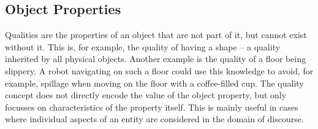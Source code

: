 

\subsection{Object Properties}
\label{sec:qualification}

Qualities are the properties of an object that are not part of it, but cannot exist without it.
This is, for example, the quality of having a shape -- a quality inherited by all physical objects.
Another example is the quality of a floor being slippery.
A robot navigating on such a floor could use this knowledge to avoid, for example,
spillage when moving on the floor with a coffee-filled cup.
The quality concept does not directly encode the value of the object property, but only focusses on characteristics of the property itself.
This is mainly useful in cases where individual aspects of an entity are considered in the domain of discourse.

